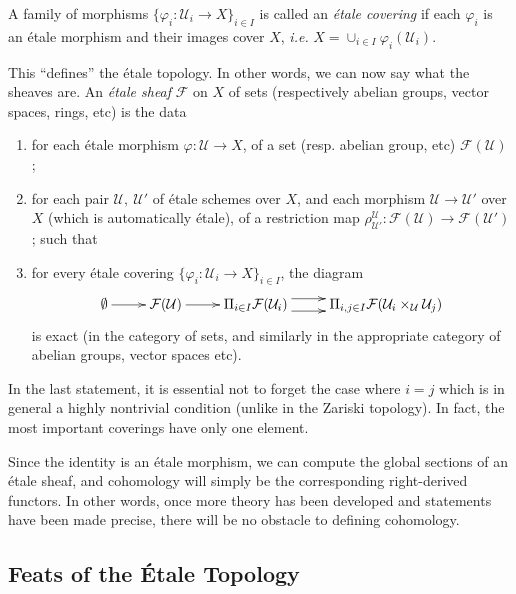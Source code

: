 \begin{definition}
A family of morphisms $\{ \varphi_i : \mathcal{U}_i \to X\}_{i \in I}$ is called an \emph{\'etale covering} if each $\varphi_i$ is an \'etale morphism and their images cover $X$, {\it i.e.} $X = \cup_{i \in I} \varphi_i (\mathcal{U}_i)$.
\end{definition}
This ``defines'' the \'etale topology. In other words, we can now say what the sheaves are. An \emph{\'etale sheaf} $\mathcal{F}$ on $X$ of sets (respectively abelian groups, vector spaces, rings, etc) is the data
\begin{enumerate}
\item for each \'etale morphism $\varphi : \mathcal{U} \to X$, of a set (resp. abelian group, etc) $\mathcal{F} (\mathcal{U})$ ;
\item for each pair $\mathcal{U}, \ \mathcal{U}'$ of \'etale schemes over $X$, and each morphism $\mathcal{U} \to \mathcal{U}'$ over $X$ (which is automatically \'etale), of a restriction map $\rho^{\mathcal{U}}_{\mathcal{U}'} : \mathcal{F}(\mathcal{U}) \to \mathcal{F}(\mathcal{U}')$ ; such that
\item for every \'etale covering $\{ \varphi_i : \mathcal{U}_i \to X\}_{i \in I}$, the diagram 
$$
\xymatrix{
\emptyset \ar[r] &
\mathcal{F} (\mathcal{U}) \ar[r] &
\Pi_{i \in I} \mathcal{F} (\mathcal{U}_i) \ar@<1ex>[r] \ar@<-1ex>[r] &
\Pi_{i,j \in I} \mathcal{F} (\mathcal{U}_i \times_\mathcal{U} \mathcal{U}_j)
}
$$
is exact (in the category of sets, and similarly in the appropriate category of abelian groups, vector spaces etc). 
\end{enumerate} 
\begin{remark}
In the last statement, it is essential not to forget the case where $i = j$ which is in general a highly nontrivial condition (unlike in the Zariski topology). In fact, the most important coverings have only one element.
\end{remark}

Since the identity is an \'etale morphism, we can compute the global sections of an \'etale sheaf, and cohomology will simply be the corresponding right-derived functors. In other words, once more theory has been developed and statements have been made precise, there will be no obstacle to defining cohomology.

\subsection{Feats of the \'Etale Topology}


